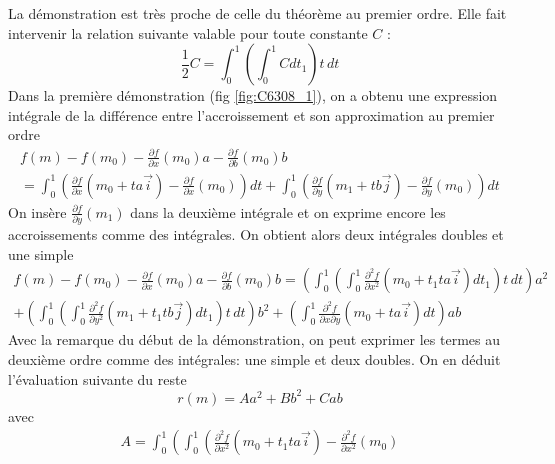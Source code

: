 \begin{demo}
 La démonstration est très proche de celle du théorème au premier ordre. Elle fait intervenir la relation suivante valable pour toute constante $C$ :
\begin{displaymath}
 \frac{1}{2}C =\int_0^1\left(\int_0^1Cdt_1 \right)t\, dt
\end{displaymath}
Dans la première démonstration (fig \ref{fig:C6308_1}), on a obtenu une expression intégrale de la différence entre l'accroissement et son approximation au premier ordre
\begin{multline*}
 f(m)-f(m_0)-\frac{\partial f}{\partial x}(m_0)a  -\frac{\partial f}{\partial b}(m_0)b \\
=
\int_0^1\left(
\frac{\partial f}{\partial x}\left(m_0+ta\overrightarrow i\right)
-
\frac{\partial f}{\partial x}\left(m_0\right) \right)dt 
+
\int_0^1\left(
\frac{\partial f}{\partial y}\left(m_1+tb\overrightarrow j\right)
-
\frac{\partial f}{\partial y}\left(m_0\right) \right)dt 
\end{multline*}
On insère $\frac{\partial f}{\partial y}(m_1)$ dans la deuxième intégrale et on exprime encore les accroissements comme des intégrales. On obtient alors deux intégrales doubles et une simple
\begin{multline*}
 f(m)-f(m_0)-\frac{\partial f}{\partial x}(m_0)a  -\frac{\partial f}{\partial b}(m_0)b 
=
\left(
  \int_0^1
    \left( 
      \int_0^1
        \frac{\partial^2f}{\partial x^2}
        \left(m_0+t_1ta\overrightarrow i\right)  
      dt_1
    \right)
  t\,dt
\right)a^2  \\
+\left(
  \int_0^1
    \left( 
      \int_0^1
        \frac{\partial^2f}{\partial y^2}
        \left(m_1+t_1tb\overrightarrow j\right)  
      dt_1
    \right)
  t\,dt
\right)b^2  
+
\left(
 \int_0^1 
    \frac{\partial^2f}{\partial x \partial y}
    \left(m_0+ta\overrightarrow i\right)  
  dt  
\right) ab
\end{multline*}
Avec la remarque du début de la démonstration, on peut exprimer les termes au deuxième ordre comme des intégrales: une simple et deux doubles. On en déduit l'évaluation suivante du reste
\begin{displaymath}
 r(m)= Aa^2 + B b^2 + Cab
\end{displaymath}
avec
\begin{multline*}
A = 
  \int_0^1
    \left( 
      \int_0^1
        \left( 
          \frac{\partial^2f}{\partial x^2}\left(m_0+t_1ta\overrightarrow i\right)
           -  
          \frac{\partial^2f}{\partial x^2}\left(m_0\right)

\end{multline*}
\end{demo}
